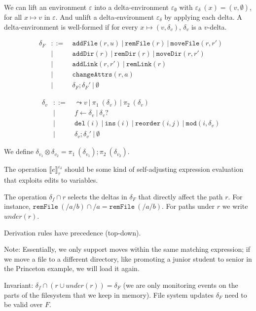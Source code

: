 \documentclass{report}
\theoremstyle{theorem}
\begin{document}
We can lift an environment $\varepsilon$ into a delta-environment $\varepsilon_\emptyset$ with $\varepsilon_\delta~(x) = (v,\emptyset)$, for all $x \mapsto v$ in $\varepsilon$.
And unlift a delta-environment $\varepsilon_\delta$ by applying each delta. A delta-environment is well-formed if for every $x \mapsto (v,\delta_v)$, $\delta_v$ is a $v$-delta.

\begin{align*}
	&\delta_F & ::= & ~\mathtt{addFile}(r,u) ~|~ \mathtt{remFile}(r) ~|~ \mathtt{moveFile}(r,r')\\
	&         & |   & ~\mathtt{addDir}(r) ~|~ \mathtt{remDir}(r) ~|~ \mathtt{moveDir}(r,r')\\
	&         & |   & ~\mathtt{addLink}(r,r') ~|~ \mathtt{remLink}(r)\\
	&         & |   & ~\mathtt{changeAttrs}(r,a)\\
	&         & |   & ~\delta_F ; {\delta_F}' ~|~ \emptyset
\end{align*}

\begin{align*}
	&\delta_v & ::= & ~\leadsto v ~|~ \pi_1~(\delta_v) ~|~ \pi_2~(\delta_v)\\
	&         & |   & ~f \leftarrow \delta_v ~|~ \delta_v?\\
	&         & |   & ~\mathtt{del}(i) ~|~ \mathtt{ins}(i) ~|~ \mathtt{reorder}(i,j) ~|~ \mathtt{mod}(i,\delta_v)\\
	&         & |   & ~\delta_v ; {\delta_v}' ~|~ \emptyset
\end{align*}

We define $\delta_{v_1} \otimes \delta_{v_2} = \pi_1~(\delta_{v_1}) ; \pi_2~(\delta_{v_2})$.

The operation $\llbracket e \rrbracket^{\varepsilon_\delta}_{\tau}$ should be some kind of self-adjusting expression evaluation that exploits edits to variables.

The operation $\delta_f \cap r$ selects the deltas in $\delta_F$ that directly affect the path $r$. For instance, $\mathtt{remFile}~(/a/b) \cap /a = \mathtt{remFile}~(/a/b)$. 
For paths under $r$ we write $under(r)$.

Derivation rules have precedence (top-down).

Note: Essentially, we only support moves within the same matching expression; if we move a file to a different directory, like promoting a junior student to senior in the Princeton example, we will load it again.

Invariant: $\delta_f \cap (r \cup under(r)) = \delta_F$ (we are only monitoring events on the parts of the filesystem that we keep in memory).
File system updates $\delta_F$ need to be valid over $F$.\\
\end{document}
